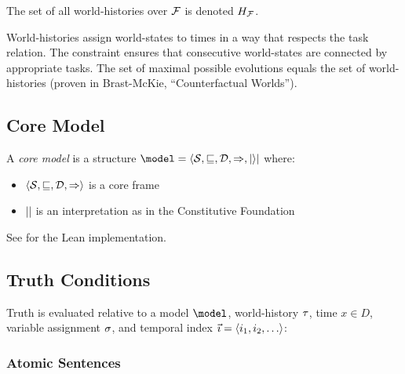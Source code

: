 \documentclass[../LogosReference.tex]{subfiles}
\begin{document}
\begin{notation}
	The set of all world-histories over $\mathcal{F}$ is denoted $H_\mathcal{F}$.
\end{notation}

\begin{remark}
	World-histories assign world-states to times in a way that respects the task relation.
	The constraint ensures that consecutive world-states are connected by appropriate tasks.
	The set of maximal possible evolutions equals the set of world-histories (proven in Brast-McKie, ``Counterfactual Worlds'').
\end{remark}


\subsection{Core Model}\label{sec:core-model}

\begin{definition}\label{def:core-model}
	A \emph{core model} is a structure $\model = \langle \statespace, \parthood, \temporalorder, \taskrel, \interp \rangle$ where:
	\begin{itemize}
		\item $\langle \mathcal{S}, \sqsubseteq, \mathcal{D}, \Rightarrow \rangle$ is a core frame
		\item $\interp$ is an interpretation as in the Constitutive Foundation
	\end{itemize}
\end{definition}

See  for the Lean implementation.


\subsection{Truth Conditions}\label{sec:truth-conditions}

Truth is evaluated relative to a model $\model$, world-history $\tau$, time $x \in D$, variable assignment $\sigma$, and temporal index $\vec{\imath} = \langle i_1, i_2, \ldots \rangle$:

\subsubsection{Atomic Sentences}
\end{document}
